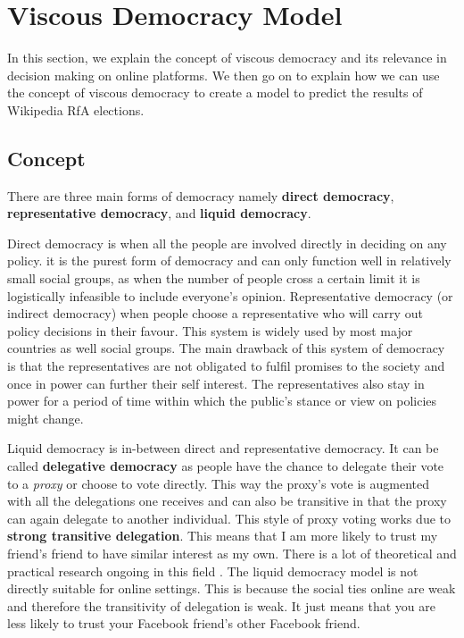 \section{Viscous Democracy Model}
\label{sec:model}
In this section, we explain the concept of viscous democracy \cite{ViscousDemocracy} and its relevance in decision making on online platforms. We then go on to explain how we can use the concept of viscous democracy to create a model to predict the results of Wikipedia RfA elections.

\subsection{Concept}
There are three main forms of democracy namely \textbf{direct democracy}, \textbf{representative democracy}, and \textbf{liquid democracy}.

Direct democracy is when all the people are involved directly in deciding on any policy. it is the purest form of democracy and can only function well in relatively small social groups, as when the number of people cross a certain limit it is logistically infeasible to include everyone's opinion. Representative democracy (or indirect democracy) when people choose a representative who will carry out policy decisions in their favour. This system is widely used by most major countries as well social groups. The main drawback of this system of democracy is that the representatives are not obligated to fulfil promises to the society and once in power can further their self interest. The representatives also stay in power for a period of time within which the public's stance or view on policies might change.

Liquid democracy is in-between direct and representative democracy. It can be called \textbf{delegative democracy} as people have the chance to delegate their vote to a \textit{proxy} or choose to vote directly. This way the proxy's vote is augmented with all the delegations one receives and can also be transitive in that the proxy can again delegate to another individual. This style of proxy voting works due to \textbf{strong transitive delegation}. This means that I am more likely to trust my friend's friend to have similar interest as my own. There is a lot of theoretical and practical research ongoing in this field \cite{kahng2018liquid,hardt2015google}. The liquid democracy model is not directly suitable for online settings. This is because the social ties online are weak and therefore the transitivity of delegation is weak. It just means that you are less likely to trust your Facebook friend's other Facebook friend. 

